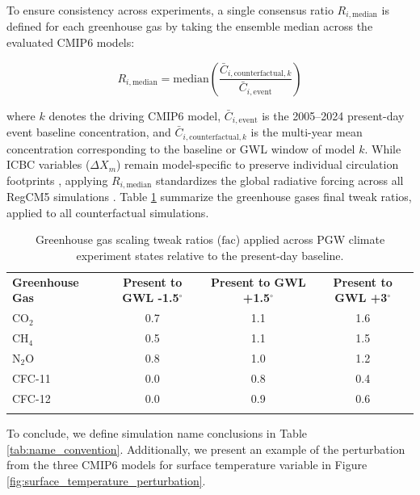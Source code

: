 \documentclass[journal abbreviation, manuscript]{copernicus}
\begin{document}
To ensure consistency across experiments, a single consensus ratio $R_{i, \text{median}}$ is defined for each greenhouse gas by taking the ensemble median across the evaluated CMIP6 models:

\begin{equation}
R_{i, \text{median}} = \text{median} \left( \frac{\bar{C}_{i, \text{counterfactual}, k}}{\bar{C}_{i, \text{event}}} \right)
\label{eq:ghg_ratio_median}
\end{equation}

where $k$ denotes the driving CMIP6 model, $\bar{C}_{i, \text{event}}$ is the 2005--2024 present-day event baseline concentration, and $\bar{C}_{i, \text{counterfactual}, k}$ is the multi-year mean concentration corresponding to the baseline or GWL window of model $k$. While ICBC variables ($\Delta X_m$) remain model-specific to preserve individual circulation footprints \citep{brogli2023pseudo}, applying $R_{i, \text{median}}$ standardizes the global radiative forcing across all RegCM5 simulations \citep{meinshausen2020ssp, calvo2026human}. Table \ref{tab:ghg_tweak_ratios} summarize the greenhouse gases final tweak ratios, applied to all counterfactual simulations.

\begin{table}[t]
\caption{Greenhouse gas scaling tweak ratios ($\mathrm{fac}$) applied across PGW climate experiment states relative to the present-day baseline.}
\label{tab:ghg_tweak_ratios}
\begin{tabular}{lccc}
\tophline
\textbf{Greenhouse Gas} & \textbf{Present to GWL -1.5$^\circ$} & \textbf{Present to GWL +1.5$^\circ$} & \textbf{Present to GWL +3$^\circ$} \\
\middlehline
CO$_2$  & 0.7 & 1.1 & 1.6 \\
CH$_4$  & 0.5 & 1.1 & 1.5 \\
N$_2$O  & 0.8 & 1.0 & 1.2 \\
CFC-11  & 0.0 & 0.8 & 0.4 \\
CFC-12  & 0.0 & 0.9 & 0.6 \\
\bottomhline
\end{tabular}
\belowtable{}
\end{table}

To conclude, we define simulation name conclusions in Table \ref{tab:name_convention}. Additionally, we present an example of the perturbation from the three CMIP6 models for surface temperature variable in Figure \ref{fig:surface_temperature_perturbation}.
\end{document}
